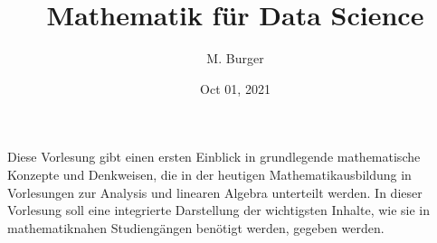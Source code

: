 
\title{Mathematik für Data Science}
\date{Oct 01, 2021}

\author{M.\@{} Burger}










\label{\detokenize{intro::doc}}



Diese Vorlesung gibt einen ersten Einblick in grundlegende mathematische Konzepte und
Denkweisen, die in der heutigen Mathematikausbildung in Vorlesungen zur Analysis und
linearen Algebra unterteilt werden. In dieser Vorlesung soll eine integrierte Darstellung
der wichtigsten Inhalte, wie sie in mathematiknahen Studiengängen benötigt werden, gegeben werden.









